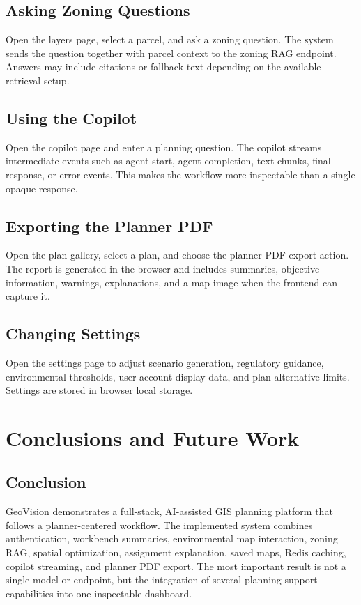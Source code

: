 \documentclass[12pt,a4paper,oneside]{report}
\begin{document}
\section{Asking Zoning Questions}
Open the layers page, select a parcel, and ask a zoning question. The system sends the question together with parcel context to the zoning RAG endpoint. Answers may include citations or fallback text depending on the available retrieval setup.

\section{Using the Copilot}
Open the copilot page and enter a planning question. The copilot streams intermediate events such as agent start, agent completion, text chunks, final response, or error events. This makes the workflow more inspectable than a single opaque response.

\section{Exporting the Planner PDF}
Open the plan gallery, select a plan, and choose the planner PDF export action. The report is generated in the browser and includes summaries, objective information, warnings, explanations, and a map image when the frontend can capture it.

\section{Changing Settings}
Open the settings page to adjust scenario generation, regulatory guidance, environmental thresholds, user account display data, and plan-alternative limits. Settings are stored in browser local storage.

\chapter{Conclusions and Future Work}
\section{Conclusion}
GeoVision demonstrates a full-stack, AI-assisted GIS planning platform that follows a planner-centered workflow. The implemented system combines authentication, workbench summaries, environmental map interaction, zoning RAG, spatial optimization, assignment explanation, saved maps, Redis caching, copilot streaming, and planner PDF export. The most important result is not a single model or endpoint, but the integration of several planning-support capabilities into one inspectable dashboard.
\end{document}
